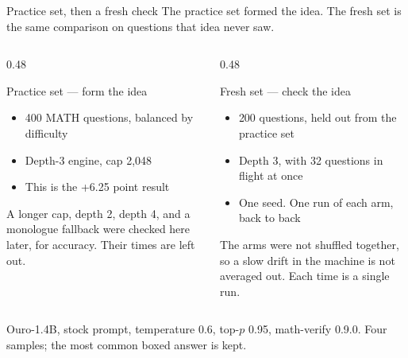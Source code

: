 \documentclass[aspectratio=169,11pt]{beamer}
\newcommand{\src}[1]{\par\vfill\begin{minipage}{0.96\textwidth}\color{muted}\tiny #1\end{minipage}\vspace{-0.2em}}
\newcommand{\Pins}{Ouro-1.4B, stock prompt, temperature 0.6, top-$p$ 0.95, math-verify 0.9.0. Four samples; the most common boxed answer is kept.}
\begin{document}
\begin{frame}{Practice set, then a fresh check}
  The practice set formed the idea. The fresh set is the same comparison on questions that idea never saw.
  \begin{columns}[T]
    \begin{column}{0.48\textwidth}
      \begin{block}{Practice set \textnormal{\small\textcolor{muted}{--- form the idea}}}
        \small
        \begin{itemize}\setlength\itemsep{0.08em}
          \item 400 MATH questions, balanced by difficulty
          \item Depth-3 engine, cap 2{,}048
          \item This is the +6.25 point result
        \end{itemize}
        \vspace{0.05em}
        {\scriptsize\color{muted} A longer cap, depth 2, depth 4, and a monologue
        fallback were checked here later, for accuracy. Their times are left out.}
      \end{block}
    \end{column}
    \begin{column}{0.48\textwidth}
      \begin{block}{Fresh set \textnormal{\small\textcolor{muted}{--- check the idea}}}
        \small
        \begin{itemize}\setlength\itemsep{0.08em}
          \item 200 questions, held out from the practice set
          \item Depth 3, with 32 questions in flight at once
          \item One seed. One run of each arm, back to back
        \end{itemize}
        \vspace{0.05em}
        {\scriptsize\color{muted} The arms were not shuffled together, so a slow
        drift in the machine is not averaged out. Each time is a single run.}
      \end{block}
    \end{column}
  \end{columns}
  \src{\Pins}
\end{frame}
\end{document}
